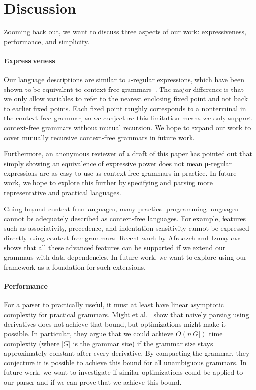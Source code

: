 \begin{code}[hide]%
\>[0]\AgdaSpace{}%
\AgdaSpace{}%
\<%
\end{code}

\section{Discussion}\label{sec:discussion}

Zooming back out, we want to discuss three aspects of our work: expressiveness, performance, and simplicity.

\paragraph{Expressiveness} Our language descriptions are similar to μ-regular
expressions, which have been shown to be equivalent to context-free
grammars~\cite{Thiemann17}. The major difference is that we only allow variables
to refer to the nearest enclosing fixed point and not back to earlier fixed
points. Each fixed point roughly corresponds to a nonterminal in the
context-free grammar, so we conjecture this limitation means we only support
context-free grammars without mutual recursion. We hope to expand our work to cover mutually recursive context-free grammars in future work.

Furthermore, an anonymous reviewer of a draft of this paper has pointed out that
simply showing an equivalence of expressive power does not mean μ-regular
expressions are as easy to use as context-free grammars in practice. In future
work, we hope to explore this further by specifying and parsing more
representative and practical languages.

Going beyond context-free languages, many practical programming languages cannot
be adequately described as context-free languages. For example, features such as
associativity, precedence, and indentation sensitivity cannot be expressed
directly using context-free grammars. Recent work by Afroozeh and
Izmaylova~\cite{one-parser-to-rule-them-all} shows that all these advanced
features can be supported if we extend our grammars with data-dependencies. In
future work, we want to explore using our framework as a foundation for such
extensions.

\paragraph{Performance} For a parser to practically useful, it must at least have linear asymptotic complexity for practical grammars. Might et al.~\cite{parsing-with-derivatives} show that naively parsing using derivatives does not achieve that bound, but optimizations might make it possible. In particular, they argue that we could achieve $O(n|G|)$ time complexity (where $|G|$ is the grammar size) if the grammar size stays approximately constant after every derivative. By compacting the grammar, they conjecture it is possible to achieve this bound for all unambiguous grammars. In future work, we want to investigate if similar optimizations could be applied to our parser and if we can prove that we achieve this bound.

